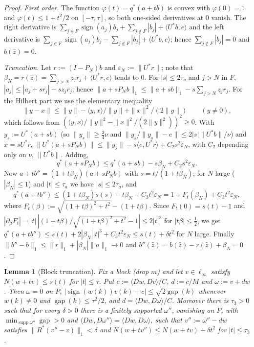 \documentclass[10pt]{amsart}
\newtheorem{lemma}[theorem]{Lemma}
\theoremstyle{definition}
\theoremstyle{remark}
\newcommand{\supp}{\operatorname{supp}}
\newcommand{\sgn}{\operatorname{sign}}
\newcommand{\gap}{\operatorname{gap}}
\newcommand{\zh}{\hat z}
\newcommand{\ip}[2]{\langle #1,#2\rangle}
\begin{document}
\begin{proof}
\emph{First order.}  The function $\varphi(t)=q^*(a+tb)$ is convex with
$\varphi(0)=1$ and $\varphi(t)\le1+t^2/2$ on $[-\tau,\tau]$, so both one-sided
derivatives at $0$ vanish.  The right derivative is
$\sum_{j\in F}\sgn(a_j)b_j+\sum_{j\notin F}|b_j|+\ip{U^*b}{e}$ and the left
derivative is $\sum_{j\in F}\sgn(a_j)b_j-\sum_{j\notin
F}|b_j|+\ip{U^*b}{e}$; hence $\sum_{j\notin F}|b_j|=0$ and $b(\zh)=0$.

\emph{Truncation.}  Let $r:=(I-P_N)b$ and $\varepsilon_N:=\|U^*r\|$; note
that $\beta_N=r(\zh)=\sum_{j>N}z_jr_j+\ip{U^*r}{e}$ tends to $0$.  For $|s|\le2\tau_a$ and
$j>N$ in $F$, $|a_j|\le|a_j+sr_j|-sz_jr_j$; hence
$\|a+sP_Nb\|_1\le\|a+sb\|_1-s\sum_{j>N}z_jr_j$.  For the Hilbert part we use
the elementary inequality
\begin{equation}\label{eq:hilbertineq}
 \|y-x\|\le\|y\|-\ip{y}{x}/\|y\|+\|x\|^2/(2\|y\|)\qquad(y\ne0),
\end{equation}
which follows from
$(\ip{y}{x}/\|y\|^2-\|x\|^2/(2\|y\|^2))^2\ge0$.  With
$y_s:=U^*(a+sb)$ (so $\|y_s\|\ge\frac34\nu$ and
$\|y_s/\|y_s\|-e\|\le2|s|\|U^*b\|/\nu$) and $x=sU^*r$,
$\|U^*(a+sP_Nb)\|\le\|y_s\|-s\ip{e}{U^*r}+C_2s^2\varepsilon_N$, with $C_2$
depending only on $\nu$, $\|U^*b\|$.  Adding,
\[
 q^*(a+sP_Nb)\le q^*(a+sb)-s\beta_N+C_2s^2\varepsilon_N.
\]
Now $a+tb''=(1+t\beta_N)(a+sP_Nb)$ with $s=t/(1+t\beta_N)$; for $N$ large
($|\beta_N|\le1$) and $|t|\le\tau_a$ we have $|s|\le2\tau_a$, and
\[
 q^*(a+tb'')\le(1+t\beta_N)s(s)-t\beta_N+C_3t^2\varepsilon_N
 =1+F_t(\beta_N)+C_3t^2\varepsilon_N,
\]
where $F_t(\beta):=\sqrt{(1+t\beta)^2+t^2}-(1+t\beta)$.  Since $F_t(0)=
s(t)-1$ and $|\partial_\beta F_t|=|t|\,|(1+t\beta)/\sqrt{(1+t\beta)^2+t^2}-1|
\le2|t|^3$ for $|t\beta|\le\frac12$, we get $q^*(a+tb'')\le s(t)+
2|\beta_N||t|^3+C_3t^2\varepsilon_N\le s(t)+\delta t^2$ for $N$ large.
Finally $\|b''-b\|_1\le\|r\|_1+|\beta_N|\|a\|_1\to0$ and
$b''(\zh)=b(\zh)-r(\zh)+\beta_N=0$.
\end{proof}

\begin{lemma}[Block truncation]\label{lem:blocktrunc}
Fix a block \textup{(}drop $m$\textup{)} and let $v\in\ell_\infty$ satisfy
$N(w+tv)\le s(t)$ for $|t|\le\tau$.  Put $c:=\ip{Dw}{Dv}/C$, $d:=c/M$ and
$\omega:=v+dw$.  Then $\omega=0$ on $P$, $|\sgn(w(k))v(k)+c|\le
\sqrt{2\gap(k)}$ whenever $w(k)\neq0$ and $\gap(k)\le\tau^2/2$, and
$d=\ip{Dw}{D\omega}/C$.  Moreover there is $\tau_3>0$ such that for every
$\delta>0$ there is a finitely supported $\omega''$, vanishing on $P$, with
$\min_{\supp\omega''}\gap>0$ and $\ip{Dw}{D\omega''}=\ip{Dw}{D\omega}$, such
that $v'':=\omega''-dw$ satisfies $\|R^*(v''-v)\|_1<\delta$ and
$N(w+tv'')\le N(w+tv)+\delta t^2$ for $|t|\le\tau_3$.
\end{lemma}
\end{document}
